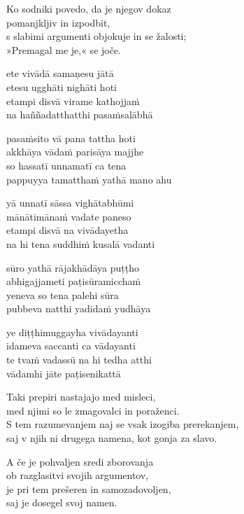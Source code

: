 Ko sodniki povedo, da je njegov dokaz\\
pomanjkljiv in izpodbit,\\
s slabimi argumenti objokuje in se žalosti;\\
»Premagal me je,« se joče.


\clearpage

ete vivādā samaṇesu jātā\\
etesu ugghāti nighāti hoti\\
etampi disvā virame kathojjaṁ\\
na haññadatthatthi pasaṁsalābhā

pasaṁsito vā pana tattha hoti\\
akkhāya vādaṁ parisāya majjhe\\
so hassatī unnamatī ca tena\\
pappuyya tamatthaṁ yathā mano ahu

yā unnatī sāssa vighātabhūmi\\
mānātimānaṁ vadate paneso\\
etampi disvā na vivādayetha\\
na hi tena suddhiṁ kusalā vadanti

sūro yathā rājakhādāya puṭṭho\\
abhigajjameti paṭisūramicchaṁ\\
yeneva so tena palehi sūra\\
pubbeva natthi yadidaṁ yudhāya

ye diṭṭhimuggayha vivādayanti\\
idameva saccanti ca vādayanti\\
te tvaṁ vadassū na hi tedha atthi\\
vādamhi jāte paṭisenikattā


\clearpage

Taki prepiri nastajajo med misleci,\\
med njimi so le zmagovalci in poraženci.\\
S tem razumevanjem naj se vsak izogiba prerekanjem,\\
saj v njih ni drugega namena, kot gonja za slavo.

A če je pohvaljen sredi zborovanja\\
ob razglasitvi svojih argumentov,\\
je pri tem prešeren in samozadovoljen,\\
saj je dosegel svoj namen.

